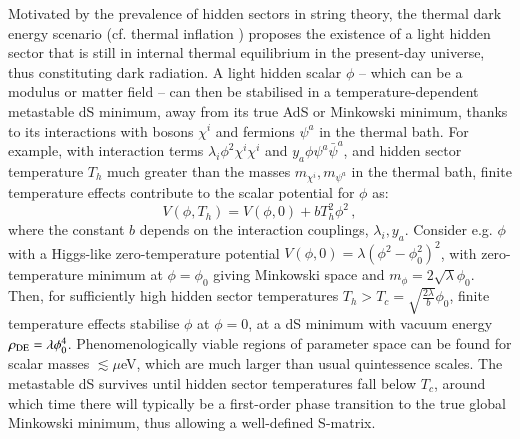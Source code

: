 Motivated by the prevalence of hidden sectors in string theory, the thermal dark energy scenario \cite{Hardy:2019apu} (cf. thermal inflation \cite{Lyth:1995ka}) proposes the existence of a light hidden sector that is still in internal thermal equilibrium in the present-day universe, thus constituting dark radiation. A light hidden scalar $\phi$ -- which can be a modulus or matter field -- can then be stabilised in a temperature-dependent metastable dS minimum, away from its true AdS or Minkowski minimum, thanks to its interactions with bosons $\chi^i$ and fermions $\psi^a$ in the thermal bath. For example, with interaction terms $\lambda_i \phi^2 \chi^i \chi^i$ and $y_a \phi \psi^a \bar{\psi}^a$, and hidden sector temperature $T_h$ much greater than the masses $m_{\chi^i}, m_{\psi^a}$ in the thermal bath, finite temperature effects contribute to the scalar potential for $\phi$ as:
\begin{equation}
V(\phi, T_h) = V(\phi,0) + b T_h^2 \phi^2\,,
\end{equation}
where the constant $b$ depends on the interaction couplings, $\lambda_i, y_a$.  Consider e.g. $\phi$ with a Higgs-like zero-temperature potential $V(\phi,0) = \lambda(\phi^2-\phi_0^2)^2$, with zero-temperature minimum at $\phi=\phi_0$ giving Minkowski space and $m_\phi=2\sqrt{\lambda}\phi_0$. Then, for sufficiently high hidden sector temperatures $T_h > T_c= \sqrt{\frac{2\lambda}{b}}\phi_0$, finite temperature effects stabilise $\phi$ at $\phi=0$, at a dS minimum with vacuum energy $\rho_{\rm DE}=\lambda \phi_0^4$. Phenomenologically viable regions of parameter space can be found for scalar masses $\lesssim \mu$eV, which are much larger than usual quintessence scales.  The metastable dS survives until hidden sector temperatures fall below $T_c$, around which time there will typically be a first-order phase transition to the true global Minkowski minimum, thus allowing a well-defined S-matrix.


